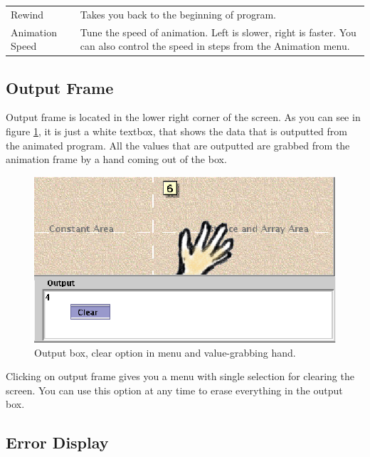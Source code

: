 \documentclass[a4paper,11pt,english]{article}
\newcommand{\bu}[1]{\textsf{#1}}
\newcommand{\menu}{\bu}
\begin{document}
{\begin{table}[h]
\begin{center}
\begin{tabular}{l|p{100mm}}
\bu{Rewind} & Takes you back to the beginning of program. \\

\bu{Animation Speed} & Tune the speed of animation. Left is slower, right is faster. You can also control the speed in steps from the \menu{Animation} menu. \\
\hline
\end{tabular}
\end{center}
\end{table}

\subsection{Output Frame}

Output frame is located in the lower right corner of the screen. As you can see in figure \ref{fig:output}, it is just a white textbox, that shows the data that is outputted from the animated program. All the values that are outputted are grabbed from the animation frame by a hand coming out of the box.

\begin{figure}[ht]
\begin{center}
\includegraphics{images/output.eps}
\caption{\label{fig:output}Output box, clear option in menu and value-grabbing hand.}
\end{center}
\end{figure}

Clicking on output frame gives you a menu with single selection for clearing the screen. You can use this option at any time to erase everything in the output box.

\subsection{Error Display}

}
\end{document}
